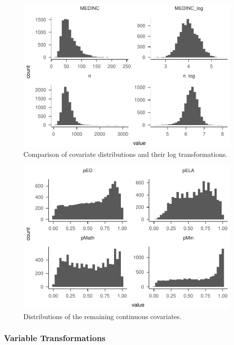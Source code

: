 \documentclass[floatsintext,man]{apa6}
\theoremstyle{definition}
\theoremstyle{definition}
\theoremstyle{definition}
\theoremstyle{remark}
\begin{document}
\begin{figure}
\centering
\includegraphics{Method_files/figure-latex/dists-1.pdf}
\caption{\label{fig:dists}Comparison of covariate distributions and their
log transformations.}
\end{figure}

\begin{figure}
\centering
\includegraphics{Method_files/figure-latex/dists2-1.pdf}
\caption{\label{fig:dists2}Distributions of the remaining continuous
covariates.}
\end{figure}

\subsubsection{Variable Transformations}\label{variable-transformations}
\end{document}
